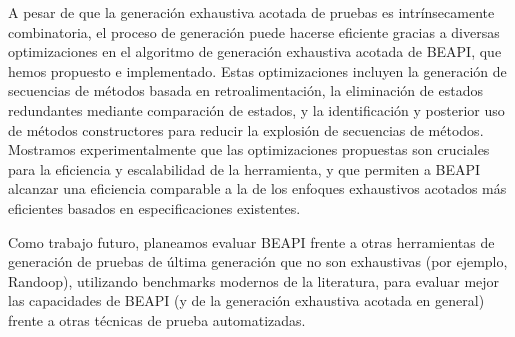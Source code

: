 A pesar de que la generación exhaustiva acotada de pruebas es intrínsecamente combinatoria, 
el proceso de generación puede hacerse eficiente gracias a diversas optimizaciones en el algoritmo de generación exhaustiva acotada de BEAPI, que hemos propuesto e implementado. 
Estas optimizaciones incluyen la generación de secuencias de métodos basada en retroalimentación, la eliminación de estados redundantes mediante comparación de estados, y la identificación y posterior uso de métodos constructores para reducir la explosión de secuencias de métodos. 
Mostramos experimentalmente que las optimizaciones propuestas son cruciales para la eficiencia y escalabilidad de la herramienta, y que permiten a BEAPI alcanzar una eficiencia comparable a la de los enfoques exhaustivos acotados más eficientes basados en especificaciones existentes.

Como trabajo futuro, planeamos evaluar BEAPI frente a otras herramientas de generación de pruebas de última generación que no son exhaustivas (por ejemplo, Randoop), 
utilizando benchmarks modernos de la literatura, para evaluar mejor las capacidades de BEAPI (y de la generación exhaustiva acotada en general) 
frente a otras técnicas de prueba automatizadas.





